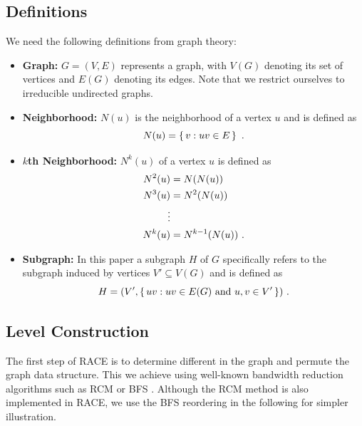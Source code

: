 \subsection*{Definitions}
We need the following definitions from graph theory:
\begin{itemize}
	\item \textbf{Graph: } $G = (V,E)$ represents a graph, with $V(G)$
              denoting its set of vertices and $E(G)$ denoting its edges. Note that
              we restrict ourselves to irreducible undirected graphs.
	\item \textbf{Neighborhood:} $N(u)$ is the neighborhood of a vertex $u$ and is defined as
	\begin{equation*}
	  N(u) = \set{ v : uv \in E}~.
	\end{equation*}
	\item \textbf{$k$th Neighborhood:} $N^{k}(u)$ of a vertex $u$ is defined as
	 \begin{align*}
	 	N^2(u) &= N(N(u))  \\
	 	N^3(u) &= N^2(N(u)) \\
	 	\vdots\\
	 	N^k(u) &= N^{k-1}(N(u)) ~.
	 \end{align*}
	\item \textbf{Subgraph:} In this paper a subgraph $H$ of $G$ specifically
              refers to the subgraph induced by vertices $V' \subseteq V(G)$ and is defined as
	\begin{equation*}
		H = (V', \set{ uv : uv \in E(G) \text{ and } u,v \in V'})~.
	\end{equation*}
\end{itemize}

\subsection{Level Construction}\label{subsec:LEVEL_CONST}

The first step of \acrshort{RACE} is to determine
different \textit{\levels} in the graph and permute the
graph data structure. This we achieve using
well-known bandwidth reduction algorithms such as \acrfull{RCM} \cite{RCM}
or \acrfull{BFS} \cite{BFS}\@. Although the RCM method is
also implemented in \acrshort{RACE}, we use the \acrshort{BFS}
reordering in the following for simpler illustration.


